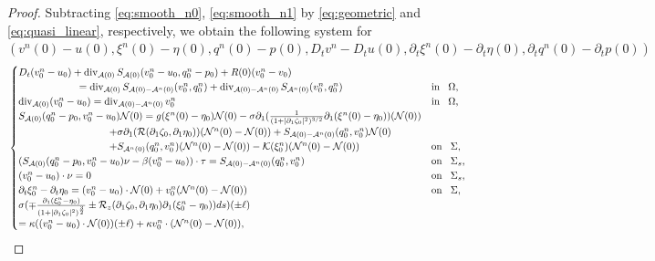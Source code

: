 \documentclass[letterpaper,reqno,10pt,twoside]{amsart}
\theoremstyle{definition}
\theoremstyle{remark}
\def\p{\partial}
\begin{document}
\begin{appendix}
\begin{proof}
				Subtracting \eqref{eq:smooth_n0}, \eqref{eq:smooth_n1} by \eqref{eq:geometric} and \eqref{eq:quasi_linear}, respectively, we obtain the following system for $(v^{n}(0)-u(0),\xi^{n}(0)-\eta(0),q^{n}(0)-p(0),D_{t}v^{n}-D_{t}u(0),\p_{t}\xi^{n}(0)-\p_{t}\eta(0),\p_{t}q^{n}(0)-\p_tp(0))$
				\begin{align}{\label{eq:converge_n0}}
					\begin{cases}
						D_{t}(v_{0}^{n}-u_{0})+\operatorname{div}_{\mathcal{A}(0)}S_{\mathcal{A}(0)}(v_{0}^{n}-u_{0},q_{0}^{n}-p_{0})+R(0)(v_{0}^{n}-v_{0})\\ \qquad\qquad\qquad=\operatorname{div}_{\mathcal{A}(0)}S_{\mathcal{A}(0)-\mathcal{A}^{n}(0)}(v_{0}^{n},q_{0}^{n})+\operatorname{div}_{\mathcal{A}(0)-\mathcal{A}^{n}(0)}S_{\mathcal{A}^{n}(0)}(v_{0}^{n},q_{0}^{n})~~~&\operatorname{in}~~\Omega,\\
						\operatorname{div}_{\mathcal{A}(0)}(v_{0}^{n}-u_{0})=\operatorname{div}_{\mathcal{A}(0)-\mathcal{A}^{n}(0)}v_{0}^{n}~~~&\operatorname{in}~~\Omega,\\
						S_{\mathcal{A}(0)}(q_{0}^{n}-p_{0},v_{0}^{n}-u_{0})\mathcal{N}(0)=g(\xi^{n}(0)-\eta_{0})\mathcal{N}(0)-\sigma\partial_{1}(\frac{1}{(1+\vert \partial_{1}\zeta_{0}\vert^{2})^{3/2}}\partial_{1}(\xi^{n}(0)-\eta_{0}))(\mathcal{N}(0))
						\\
						\quad\quad\quad\quad\quad\quad\quad\quad\quad+\sigma\partial_{1}(\mathcal{R}(\partial_{1}\zeta_{0},\partial_{1}\eta_{0}))(\mathcal{N}^{n}(0)-\mathcal{N}(0))+S_{\mathcal{A}(0)-\mathcal{A}^{n}(0)}(q_{0}^{n},v_{0}^{n})\mathcal{N}(0)\\
						\quad\quad\quad\quad\quad\quad\quad\quad\quad+S_{\mathcal{A}^{n}(0)}(q_{0}^{n},v_{0}^{n})(\mathcal{N}^{n}(0)-\mathcal{N}(0))-\mathcal{K}(\xi_{0}^{n})(\mathcal{N}^{n}(0)-\mathcal{N}(0))~~~&\operatorname{on}~~\Sigma,\\
						(S_{\mathcal{A}(0)}(q_{0}^{n}-p_{0},v_{0}^{n}-u_{0})\nu-\beta (v_{0}^{n}-u_{0}))\cdot \tau=S_{\mathcal{A}(0)-\mathcal{A}^{n}(0)}(q_{0}^{n},v_{0}^{n})~~~&\operatorname{on}~~\Sigma_{s},\\
						(v_{0}^{n}-u_{0})\cdot \nu=0~~~&\operatorname{on}~~\Sigma_{s},\\
						\partial_{t}\xi_{0}^{n}-\p_{t}\eta_{0}=(v_{0}^{n}-u_{0})\cdot \mathcal{N}(0)+v_{0}^{n}(\mathcal{N}^{n}(0)-\mathcal{N}(0))~~~&\operatorname{on}~~\Sigma,\\
						\sigma(\mp \frac{\partial_{1}(\xi_{0}^{n}-\eta_{0})}{(1+\vert \partial_{1}\zeta_{0}\vert^{2})^{\frac{3}{2}}}\pm \mathcal{R}_{z}(\partial_{1}\zeta_{0},\partial_{1}\eta_{0})\partial_{1}(\xi_{0}^{n}-\eta_{0}))ds)(\pm\ell)\\=\kappa ((v_{0}^{n}-u_{0})\cdot \mathcal{N}(0))(\pm \ell)+\kappa v_{0}^{n}\cdot (\mathcal{N}^{n}(0)-\mathcal{N}(0)),

\end{cases}
\end{align}
\end{proof}
\end{appendix}
\end{document}
